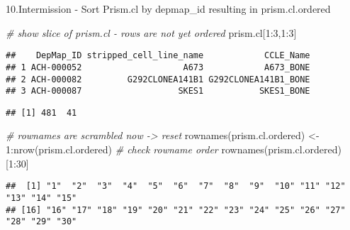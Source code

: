 \documentclass[
]{article}
\newenvironment{Shaded}{\begin{snugshade}}{\end{snugshade}}
\newcommand{\CommentTok}[1]{\textcolor[rgb]{0.56,0.35,0.01}{\textit{#1}}}
\newcommand{\DecValTok}[1]{\textcolor[rgb]{0.00,0.00,0.81}{#1}}
\newcommand{\FunctionTok}[1]{\textcolor[rgb]{0.00,0.00,0.00}{#1}}
\newcommand{\NormalTok}[1]{#1}
\newcommand{\OtherTok}[1]{\textcolor[rgb]{0.56,0.35,0.01}{#1}}
\newcommand{\SpecialCharTok}[1]{\textcolor[rgb]{0.00,0.00,0.00}{#1}}
\begin{document}
10.Intermission - Sort Prism.cl by depmap\_id resulting in
prism.cl.ordered

\begin{Shaded}
\begin{Highlighting}[]
\CommentTok{\# show slice of prism.cl {-} rows are not yet ordered}
\NormalTok{prism.cl[}\DecValTok{1}\SpecialCharTok{:}\DecValTok{3}\NormalTok{,}\DecValTok{1}\SpecialCharTok{:}\DecValTok{3}\NormalTok{]}
\end{Highlighting}
\end{Shaded}

\begin{verbatim}
##    DepMap_ID stripped_cell_line_name            CCLE_Name
## 1 ACH-000052                    A673            A673_BONE
## 2 ACH-000082         G292CLONEA141B1 G292CLONEA141B1_BONE
## 3 ACH-000087                   SKES1           SKES1_BONE
\end{verbatim}

\begin{Shaded}
\end{Shaded}

\begin{verbatim}
## [1] 481  41
\end{verbatim}

\begin{Shaded}
\begin{Highlighting}[]
\CommentTok{\# rownames are scrambled now {-}\textgreater{} reset}
\FunctionTok{rownames}\NormalTok{(prism.cl.ordered) }\OtherTok{\textless{}{-}} \DecValTok{1}\SpecialCharTok{:}\FunctionTok{nrow}\NormalTok{(prism.cl.ordered)}
\CommentTok{\# check rowname order}
\FunctionTok{rownames}\NormalTok{(prism.cl.ordered)[}\DecValTok{1}\SpecialCharTok{:}\DecValTok{30}\NormalTok{]}
\end{Highlighting}
\end{Shaded}

\begin{verbatim}
##  [1] "1"  "2"  "3"  "4"  "5"  "6"  "7"  "8"  "9"  "10" "11" "12" "13" "14" "15"
## [16] "16" "17" "18" "19" "20" "21" "22" "23" "24" "25" "26" "27" "28" "29" "30"
\end{verbatim}
\end{document}

